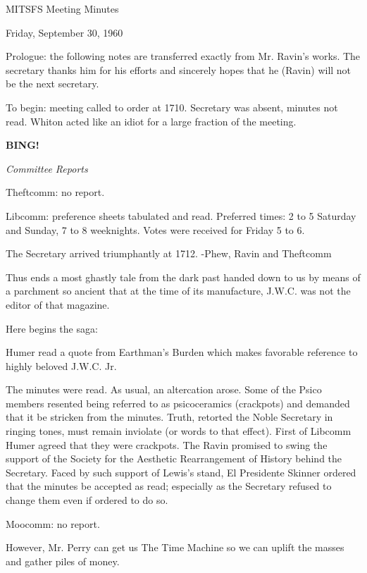 \documentclass[12pt]{article}
\newcommand{\bing}{{\bf BING!} }
\newcommand{\goto}[1]{\bing \vskip 12pt \centerline{{\em{#1}}}}
\begin{document}
\begin{center}

MITSFS Meeting Minutes

Friday, September 30, 1960

\end{center}
 
\vspace{12pt}

\setlength{\parskip}{6pt}

\noindent

Prologue: the following notes are transferred exactly from Mr. Ravin's works. The secretary thanks him for his efforts and sincerely hopes that he (Ravin) will not be the next secretary.

To begin: meeting called to order at 1710. Secretary was absent, minutes not read. Whiton acted like an idiot for a large fraction of the meeting.

\goto{Committee Reports}

Theftcomm: no report.

Libcomm: preference sheets tabulated and read. Preferred times: 2 to 5 Saturday and Sunday, 7 to 8 weeknights. Votes were received for Friday 5 to 6.

The Secretary arrived triumphantly at 1712. -Phew, Ravin and Theftcomm

Thus ends a most ghastly tale from the dark past handed down to us by means of a parchment so ancient that at the time of its manufacture, J.W.C. was not the editor of that magazine.

Here begins the saga:

Humer read a quote from Earthman's Burden which makes favorable reference to highly beloved J.W.C. Jr.

The minutes were read. As usual, an altercation arose. Some of the Psico members resented being referred to as psicoceramics (crackpots) and demanded that it be stricken from the minutes. Truth, retorted the Noble Secretary in ringing tones, must remain inviolate (or words to that effect). First of Libcomm Humer agreed that they were crackpots. The Ravin promised to swing the support of the Society for the Aesthetic Rearrangement of History behind the Secretary. Faced by such support of Lewis's stand, El Presidente Skinner ordered that the minutes be accepted as read; especially as the Secretary refused to change them even if ordered to do so.

Moocomm: no report.

However, Mr. Perry can get us The Time Machine so we can uplift the masses and gather piles of money.
\end{document}
